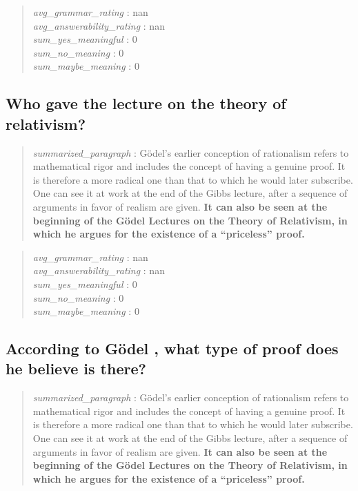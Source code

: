 \begin{quote}
\emph{avg\_grammar\_rating} : nan\\
\emph{avg\_answerability\_rating} : nan\\
\emph{sum\_yes\_meaningful} : 0\\
\emph{sum\_no\_meaning} : 0\\
\emph{sum\_maybe\_meaning} : 0
\end{quote}

\hypertarget{who-gave-the-lecture-on-the-theory-of-relativism}{%
\subsection{Who gave the lecture on the theory of
relativism?}\label{who-gave-the-lecture-on-the-theory-of-relativism}}

\begin{quote}
\emph{summarized\_paragraph} : Gödel's earlier conception of rationalism
refers to mathematical rigor and includes the concept of having a
genuine proof. It is therefore a more radical one than that to which he
would later subscribe. One can see it at work at the end of the Gibbs
lecture, after a sequence of arguments in favor of realism are given.
\textbf{It can also be seen at the beginning of the Gödel Lectures on
the Theory of Relativism, in which he argues for the existence of a
``priceless'' proof.}
\end{quote}

\begin{quote}
\emph{avg\_grammar\_rating} : nan\\
\emph{avg\_answerability\_rating} : nan\\
\emph{sum\_yes\_meaningful} : 0\\
\emph{sum\_no\_meaning} : 0\\
\emph{sum\_maybe\_meaning} : 0
\end{quote}

\hypertarget{according-to-guxf6del-what-type-of-proof-does-he-believe-is-there}{%
\subsection{According to Gödel , what type of proof does he believe is
there?}\label{according-to-guxf6del-what-type-of-proof-does-he-believe-is-there}}

\begin{quote}
\emph{summarized\_paragraph} : Gödel's earlier conception of rationalism
refers to mathematical rigor and includes the concept of having a
genuine proof. It is therefore a more radical one than that to which he
would later subscribe. One can see it at work at the end of the Gibbs
lecture, after a sequence of arguments in favor of realism are given.
\textbf{It can also be seen at the beginning of the Gödel Lectures on
the Theory of Relativism, in which he argues for the existence of a
``priceless'' proof.}
\end{quote}

